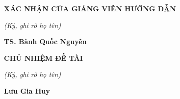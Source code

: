 \vfill

\begin{center}
\begin{minipage}[t]{0.48\textwidth}
  \centering
  {\normalsize\textbf{XÁC NHẬN CỦA GIẢNG VIÊN HƯỚNG DẪN}\par}
  \vspace{0.15cm}
  {\small\itshape (Ký, ghi rõ họ tên)\par}
  \vspace{1.25cm}
  \vspace{3.0cm}
  {\normalsize\textbf{TS. Bành Quốc Nguyên}\par}
\end{minipage}%
\hfill
\begin{minipage}[t]{0.48\textwidth}
  \centering
  {\normalsize\textbf{CHỦ NHIỆM ĐỀ TÀI}\par}
  \vspace{0.15cm}
  {\small\itshape (Ký, ghi rõ họ tên)\par}
  \vspace{1.85cm}
  \vspace{3.0cm}
  {\normalsize\textbf{Lưu Gia Huy}\par}
\end{minipage}
\end{center}

\clearpage
